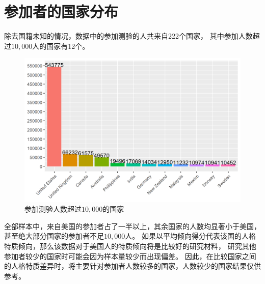 \documentclass[UTF8]{ctexart}
\begin{document}
\section{参加者的国家分布}
除去国籍未知的情况，数据中的参加测验的人共来自222个国家，
其中参加人数超过$10,000$人的国家有12个。
\begin{figure}[H]
  \centering
  \includegraphics[scale=0.79]{Country.png}
  \caption{参加测验人数超过$10,000$的国家}
\end{figure}
全部样本中，来自美国的参加者占了一半以上，其余国家的人数均显著小于美国，
甚至绝大部分国家的参加者不足$10,000$人。
如果以平均倾向得分代表该国的人格特质倾向，那么该数据对于美国人的特质倾向将是比较好的研究材料，
研究其他参加者较少的国家时可能会因为样本量较少而出现偏差。
因此，在比较国家之间的人格特质差异时，将主要针对参加者人数较多的国家，人数较少的国家结果仅供参考。
\end{document}
